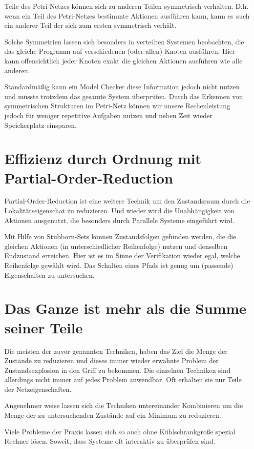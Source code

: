 Teile des Petri-Netzes können sich zu anderen Teilen symmetrisch verhalten. 
D.h. wenn ein Teil des Petri-Netzes bestimmte Aktionen ausführen kann, kann es auch ein anderer Teil der sich zum ersten symmetrisch verhält.

Solche Symmetrien lassen sich besonders in verteilten Systemen beobachten, die das gleiche Programm auf verschiedenen (oder allen) Knoten ausführen.
Hier kann offensichtlich jeder Knoten exakt die gleichen Aktionen ausführen wie alle anderen.

Standardmäßig kann ein Model Checker diese Information jedoch nicht nutzen und müsste trotzdem das gesamte System überprüfen.
Durch das Erkennen von symmetrischen Strukturen im Petri-Netz können wir unsere Rechenleistung jedoch für weniger repetitive Aufgaben nutzen und neben Zeit wieder Speicherplatz einsparen.

\section{Effizienz durch Ordnung mit Partial-Order-Reduction}
Partial-Order-Reduction ist eine weitere Technik um den Zustandsraum durch die Lokalitätseigenschat zu reduzieren. 
Und wieder wird die Unabhängigkeit von Aktionen ausgenutzt, die besonders durch Parallele Systeme eingeführt wird.

Mit Hilfe von Stubborn-Sets können Zustandsfolgen gefunden werden, die die gleichen Aktionen (in unterschiedlicher Reihenfolge) nutzen und denselben Endzustand erreichen.
Hier ist es im Sinne der Verifikation wieder egal, welche Reihenfolge gewählt wird.
Das Schalten eines Pfads ist genug um (passende) Eigenschaften zu untersuchen.

\section{Das Ganze ist mehr als die Summe seiner Teile}
Die meisten der zuvor genannten Techniken, haben das Ziel die Menge der Zustände zu reduzieren und dieses immer wieder erwähnte Problem der Zustandsexplosion in den Griff zu bekommen.
Die einzelnen Techniken sind allerdings nicht immer auf jedes Problem anwendbar. Oft erhalten sie nur Teile der Netzeigenschaften.

Angenehmer weise lassen sich die Techniken untereinander Kombinieren um die Menge der zu untersuchenden Zustände auf ein Minimum zu reduzieren.

Viele Probleme der Praxis lassen sich so auch ohne Kühlschrankgroße spezial Rechner lösen.
Soweit, dass Systeme oft interaktiv zu überprüfen sind.